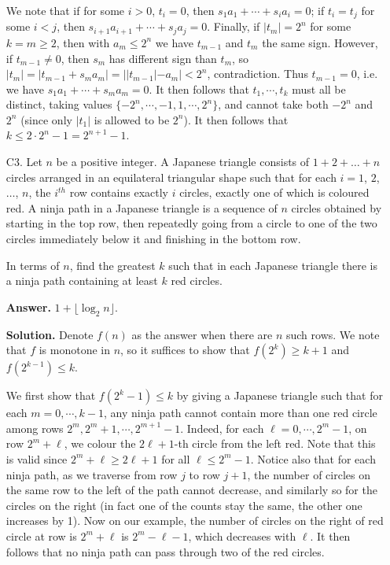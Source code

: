 \documentclass[11pt,a4paper]{article}
\begin{document}
\begin{enumerate}
    	We note that if for some $i > 0$, $t_i = 0$, then 
    	$s_1a_1 + \cdots + s_ia_i = 0$; 
    	if $t_i = t_j$ for some $i < j$, 
    	then $s_{i+1}a_{i+1} + \cdots + s_ja_j = 0$. 
    	Finally, if $|t_m| = 2^n$ for some $k=m\ge 2$, 
    	then with $a_m\le 2^n$ we have $t_{m-1}$ and $t_m$ the same sign. 
    	However, if $t_{m-1}\neq 0$, then $s_m$ has different sign than $t_m$, 
    	so $|t_m| = |t_{m-1} + s_ma_m| = ||t_{m - 1}| - a_m| < 2^n$, contradiction. 
    	Thus $t_{m -1} = 0$, 
    	i.e. we have $s_1a_1 + \cdots + s_ma_m = 0$. 
    	It then follows that $t_1, \cdots, t_k$ must all be distinct, 
    	taking values $\{-2^n, \cdots, -1, 1, \cdots, 2^n\}$, 
    	and cannot take both $-2^n$ and $2^n$ (since only $|t_1|$ is allowed to be $2^n$). 
    	It then follows that $k\le 2\cdot 2^n - 1 = 2^{n + 1} - 1$. 
    	
    	\item [C3.] 
    	Let $n$ be a positive integer. A Japanese triangle consists of $1 + 2 + \dots + n$ circles arranged in an equilateral triangular shape such that for each $i = 1$, $2$, $\dots$, $n$, the $i^{th}$ row contains exactly $i$ circles, exactly one of which is coloured red. A ninja path in a Japanese triangle is a sequence of $n$ circles obtained by starting in the top row, then repeatedly going from a circle to one of the two circles immediately below it and finishing in the bottom row. 
    	
    	In terms of $n$, find the greatest $k$ such that in each Japanese triangle there is a ninja path containing at least $k$ red circles.	
    	
    	
    	\textbf{Answer.} $1 + \lfloor \log_2 n\rfloor$. 
    	
    	\textbf{Solution.} Denote $f(n)$ as the answer when there are $n$ such rows. 
    	We note that $f$ is monotone in $n$, 
    	so it suffices to show that $f(2^k) \ge k + 1$ and $f(2^{k - 1}) \le k$.
    	
    	We first show that $f(2^{k} - 1) \le k$ by giving a Japanese triangle such that for each $m=0, \cdots, k - 1$, any ninja path cannot contain more than one red circle among rows $2^m, 2^m + 1, \cdots, 2^{m + 1} - 1$. 
    	Indeed, for each $\ell=0, \cdots, 2^m - 1$, 
    	on row $2^m + \ell$, we colour the $2\ell + 1$-th circle from the left red. 
    	Note that this is valid since $2^m + \ell\ge 2\ell + 1$ for all $\ell\le 2^m - 1$. 
    	Notice also that for each ninja path, as we traverse from row $j$ to row $j + 1$, 
    	the number of circles on the same row to the left of the path cannot decrease, 
    	and similarly so for the circles on the right (in fact one of the counts stay the same, 
    	the other one increases by 1). 
    	Now on our example, the number of circles on the right of red circle at row is $2^m + \ell$ is 
    	$2^m - \ell - 1$, which decreases with $\ell$. 
    	It then follows that no ninja path can pass through two of the red circles. 
    	

\end{enumerate}
\end{document}
